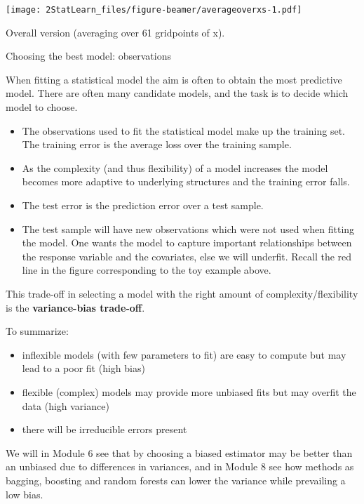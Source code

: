 \documentclass[ignorenonframetext,]{beamer}
\providecommand{\tightlist}{%
  \setlength{\itemsep}{0pt}\setlength{\parskip}{0pt}}
\begin{document}
\begin{frame}

\texttt{[image: 2StatLearn\_files/figure-beamer/averageoverxs-1.pdf]}

Overall version (averaging over 61 gridpoints of x).

\end{frame}

\begin{frame}

\begin{block}{Choosing the best model: observations}

When fitting a statistical model the aim is often to obtain the most
predictive model. There are often many candidate models, and the task is
to decide which model to choose.

\begin{itemize}
\tightlist
\item
  The observations used to fit the statistical model make up the
  training set. The training error is the average loss over the training
  sample.
\item
  As the complexity (and thus flexibility) of a model increases the
  model becomes more adaptive to underlying structures and the training
  error falls.
\item
  The test error is the prediction error over a test sample.
\item
  The test sample will have new observations which were not used when
  fitting the model. One wants the model to capture important
  relationships between the response variable and the covariates, else
  we will underfit. Recall the red line in the figure corresponding to
  the toy example above.
\end{itemize}

\end{block}

\end{frame}

\begin{frame}

This trade-off in selecting a model with the right amount of
complexity/flexibility is the \textbf{variance-bias trade-off}.

To summarize:

\begin{itemize}
\tightlist
\item
  inflexible models (with few parameters to fit) are easy to compute but
  may lead to a poor fit (high bias)
\item
  flexible (complex) models may provide more unbiased fits but may
  overfit the data (high variance)
\item
  there will be irreducible errors present
\end{itemize}

We will in Module 6 see that by choosing a biased estimator may be
better than an unbiased due to differences in variances, and in Module 8
see how methods as bagging, boosting and random forests can lower the
variance while prevailing a low bias.

\end{frame}
\end{document}
